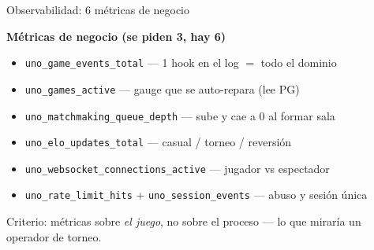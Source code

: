 \documentclass[aspectratio=169,10pt]{beamer}
\begin{document}
\begin{frame}{Observabilidad: 6 métricas de negocio}
  \vfill
  \begin{center}
    \begin{minipage}{0.78\textwidth}
      \textbf{\small Métricas de negocio (se piden 3, hay 6)}
      \begin{itemize}\small
        \item \texttt{uno\_game\_events\_total} --- 1 hook en el log $=$ todo el dominio
        \item \texttt{uno\_games\_active} --- gauge que se auto-repara (lee PG)
        \item \texttt{uno\_matchmaking\_queue\_depth} --- sube y cae a 0 al formar sala
        \item \texttt{uno\_elo\_updates\_total} --- casual / torneo / \alert{reversión}
        \item \texttt{uno\_websocket\_connections\_active} --- jugador vs espectador
        \item \texttt{uno\_rate\_limit\_hits} + \texttt{uno\_session\_events} --- abuso y sesión única
      \end{itemize}
    \end{minipage}
  \end{center}
  \vfill
  \centering\scriptsize\color{cGrey}
  Criterio: métricas sobre \emph{el juego}, no sobre el proceso --- lo que miraría un operador de torneo.
\end{frame}
\end{document}
